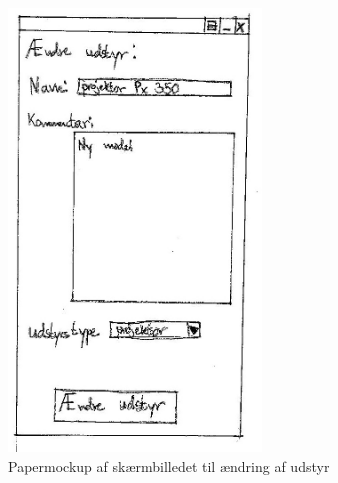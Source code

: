 \begin{figure}[h!]
  \centering
    \includegraphics[width=0.6\textwidth]{Appendix/GUI-Prototype/PaperMockup/AendreUdstyr_001}
  \caption{Papermockup af skærmbilledet til ændring af udstyr}
\label{App_GUI_paper_AendreUdstyr}
\end{figure}

